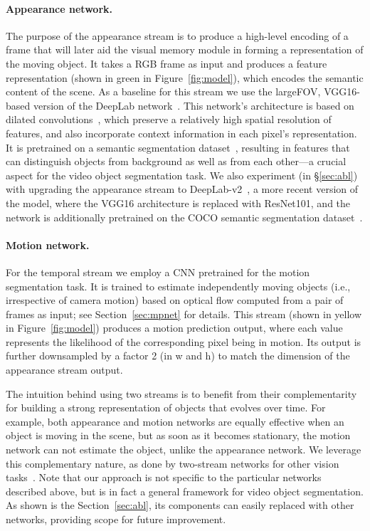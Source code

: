 \paragraph{\bf Appearance network.}
The purpose of the appearance stream is to produce a high-level encoding of a
frame that will later aid the visual memory module in forming a representation
of the moving object. It takes a  RGB frame as input
and produces a  feature representation
(shown in green in Figure~\ref{fig:model}), which encodes the semantic content
of the scene. As a  baseline for this stream we use the largeFOV, VGG16-based
version of the DeepLab network~\cite{chen2014semantic}. This network's
architecture is based on dilated convolutions~\cite{chen2014semantic}, which
preserve a relatively high spatial resolution of features, and also incorporate
context information in each pixel's representation. It is pretrained on a
semantic segmentation dataset~\cite{pascalvoc2012}, resulting in features that
can distinguish objects from background as well as from each other---a crucial
aspect for the video object segmentation task. We also experiment (in
\S\ref{sec:abl}) with upgrading the appearance stream to
DeepLab-v2~\cite{CP2016Deeplab}, a more recent version of the model, where the
VGG16 architecture is replaced with ResNet101, and the network is additionally
pretrained on the COCO semantic segmentation dataset~\cite{lin2014microsoft}.

\paragraph{\bf Motion network.}
For the temporal stream we employ a CNN pretrained for the motion segmentation
task. It is trained to estimate independently moving objects (i.e.,
irrespective of camera motion) based on optical flow computed from a pair of
frames as input; see Section~\ref{sec:mpnet} for details. This stream (shown in
yellow in Figure~\ref{fig:model}) produces a 
motion prediction output, where each value represents the likelihood of the
corresponding pixel being in motion. Its output is further downsampled by a
factor 2 (in w and h) to match the dimension of the appearance stream output.

The intuition behind using two streams is to benefit from their complementarity
for building a strong representation of objects that evolves over time. For
example, both appearance and motion networks are equally effective when an
object is moving in the scene, but as soon as it becomes stationary, the motion
network can not estimate the object, unlike the appearance network. We leverage
this complementary nature, as done by two-stream networks for other vision
tasks~\cite{simonyan2014two}. Note that our approach is not specific to the
particular networks described above, but is in fact a general framework for
video object segmentation. As shown is the Section~\ref{sec:abl}, its
components can easily replaced with other networks, providing scope for future
improvement.

